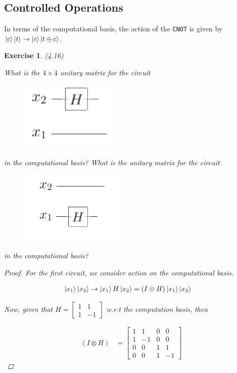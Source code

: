 \documentclass[11pt]{article}
\newcommand\0{\mathbf{0}}
\newcommand\<{\langle}
\renewcommand\>{\rangle}
\newtheorem{exercise}[theorem]{Exercise}
\begin{document}
\subsection{Controlled Operations} 

In terms of the computational basis, the action of the \texttt{CNOT} is given by $\ket{c}\ket{t} \rightarrow \ket{c} \ket{t \oplus c}$.

\begin{exercise}(4.16)

What is the $4\times 4$ unitary matrix for the circuit

\begin{figure}[H]
\centering
\includegraphics[width=.2\linewidth]{images/4_16-1.png}
\end{figure}

in the computational basis? What is the unitary matrix for the circuit

\begin{figure}[H]
\centering
\includegraphics[width=.25\linewidth]{images/4_16-2.png}
\end{figure}

in the computational basis?

\begin{proof}
	For the first circuit, we consider action on the computational basis.
	
	\begin{align*}
		\ket{x_1}\ket{x_2 } &\rightarrow \ket{x_1}H\ket{x_2} = (I \otimes H) \ket{x_1}\ket{x_2 }
	\end{align*}

Now, given that $H = \begin{bmatrix} 1 & 1 \\ 1 & -1\end{bmatrix}$ w.r.t the computation basis, then

\begin{align*}
	(I \otimes H) &= \begin{bmatrix}	
	1 & 1 & 0 & 0 \\
	1 & -1 & 0 & 0 \\
	0 & 0 & 1 & 1 \\
	0 & 0 & 1 & -1
 \end{bmatrix}
\end{align*}


\end{proof}
\end{exercise}
\end{document}
